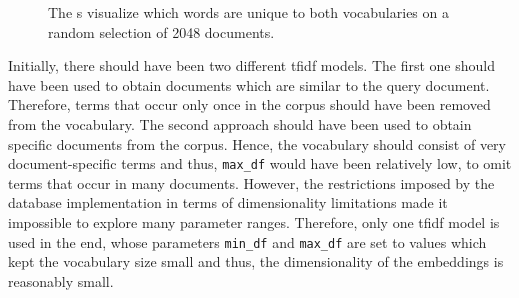 \begin{figure}%
    \centering
    \qquad
    \caption[\wordcloud{}s for different \ac{tfidf} preprocessors]{The \wordcloud{}s visualize which words are unique to both vocabularies 
    on a random selection of 2048 documents.}%
    \label{fig:differences-vocabularies}%
\end{figure}

Initially, there should have been two different \ac{tfidf} models.
The first one should have been used to obtain documents which are similar to the query document.
Therefore, terms that occur only once in the corpus should have been removed from the vocabulary.
The second approach should have been used to obtain specific documents from the corpus.
Hence, the vocabulary should consist of very document-specific terms and thus, \texttt{max\_df} would have been relatively low, to omit terms that occur in many documents.
However, the restrictions imposed by the database implementation in terms of dimensionality limitations
made it impossible to explore many parameter ranges.
Therefore, only one \ac{tfidf} model is used in the end, whose parameters \texttt{min\_df} and \texttt{max\_df} are set to values 
which kept the vocabulary size small and thus,
the dimensionality of the embeddings is reasonably small.